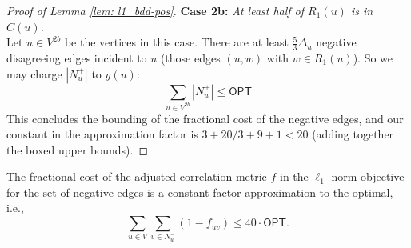 \begin{proof}[Proof of Lemma \ref{lem: l1_bdd-pos}]
\noindent \textbf{Case 2b:} \emph{At least half of $R_1(u)$ is in $C(u)$.}\\
Let $ u \in  V^{2b}$ be the vertices in this case.
There are at least $\frac{5}{3}\Delta_u$ negative disagreeing edges incident to $u$ (those edges $(u,w)$ with $w \in R_1(u)$). So we may charge $|N_u^+|$ to $y(u)$:
$$\boxed{\sum_{u \in V^{2b}} |N_u^+| \leq  \textsf{OPT}}$$
This concludes the bounding of the fractional cost of the negative edges, 
and our constant in the approximation factor is $3+ 20/3 + 9 + 1 < 20$ (adding together the boxed upper bounds).
\end{proof}

\begin{lemma} \label{lem: l1_bdd-neg}
    The fractional cost of the adjusted correlation metric $f$ in the $\ell_1$-norm objective for the set of negative edges is a constant factor approximation to the optimal, i.e.,
    $$ \sum_{u \in V} \sum_{v \in N_u^-} (1-f_{uv}) \leq 40\cdot \textsf{OPT}.$$
\end{lemma}

